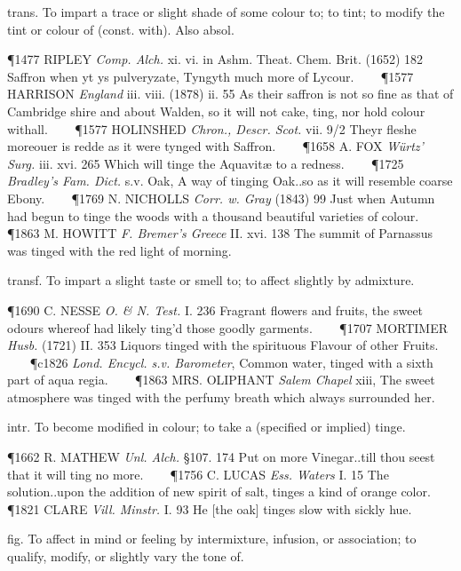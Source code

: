 \begin{description}[wide, labelwidth=!, labelindent=0pt]
\begin{myenumerate}

 trans. To impart a trace or slight shade of some colour to; to tint; to modify the tint or colour of (const. with). Also absol.

\P 1477 RIPLEY  \textit{Comp. Alch.} xi. vi. in Ashm. Theat. Chem. Brit. (1652) 182 Saffron when yt ys pulveryzate, Tyngyth much more of Lycour.    
\P 1577 HARRISON  \textit{England} iii. viii. (1878) ii. 55 As their saffron is not so fine as that of Cambridge shire and about Walden, so it will not cake, ting, nor hold colour withall.    
\P 1577 HOLINSHED  \textit{Chron., Descr. Scot.} vii. 9/2 Theyr fleshe moreouer is redde as it were tynged with Saffron.    
\P 1658 A. FOX  \textit{Würtz' Surg.} iii. xvi. 265 Which will tinge the Aquavitæ to a redness.    
\P 1725 \textit{Bradley's  Fam. Dict.} s.v. Oak, A way of tinging Oak..so as it will resemble coarse Ebony.    
\P 1769 N. NICHOLLS  \textit{Corr. w. Gray} (1843) 99 Just when Autumn had begun to tinge the woods with a thousand beautiful varieties of colour.    
\P 1863 M. HOWITT  \textit{F. Bremer's Greece} II. xvi. 138 The summit of Parnassus was tinged with the red light of morning.

 transf. To impart a slight taste or smell to; to affect slightly by admixture.

\P 1690 C. NESSE  \textit{O. \& N. Test.} I. 236 Fragrant flowers and fruits, the sweet odours whereof had likely ting'd those goodly garments.    
\P 1707 MORTIMER  \textit{Husb.} (1721) II. 353 Liquors tinged with the spirituous Flavour of other Fruits.    
\P c1826  \textit{Lond. Encycl. s.v. Barometer}, Common water, tinged with a sixth part of aqua regia.    
\P 1863 MRS. OLIPHANT  \textit{Salem Chapel} xiii, The sweet atmosphere was tinged with the perfumy breath which always surrounded her.

 intr. To become modified in colour; to take a (specified or implied) tinge.

\P 1662 R. MATHEW  \textit{Unl. Alch.} §107. 174 Put on more Vinegar..till thou seest that it will ting no more.    
\P 1756 C. LUCAS  \textit{Ess. Waters} I. 15 The solution..upon the addition of new spirit of salt, tinges a kind of orange color.    
\P 1821 CLARE  \textit{Vill. Minstr.} I. 93 He [the oak] tinges slow with sickly hue.

 fig. To affect in mind or feeling by intermixture, infusion, or association; to qualify, modify, or slightly vary the tone of.


\end{myenumerate}
\end{description}
